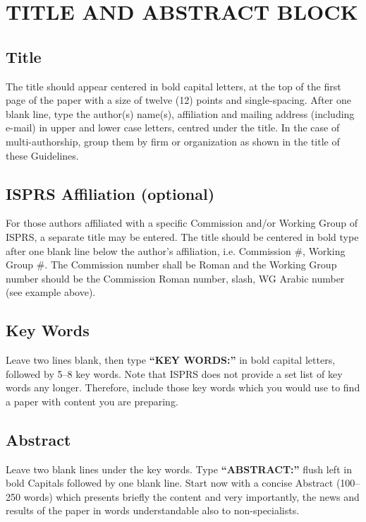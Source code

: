 \documentclass{isprs}
\begin{document}
\section{TITLE AND ABSTRACT BLOCK}\label{sec:TITLE AND ABSTRACT BLOCK}

\subsection{Title}\label{sec:Title}

The title should appear centered in bold capital letters, at the top of the 
first page of the paper with a size of twelve (12) points and single-spacing. 
After one blank line, type the author(s) name(s), affiliation and mailing address 
(including e-mail) in upper and lower case letters, centred under the title. In the 
case of multi-authorship, group them by firm or organization as shown in the title 
of these Guidelines. 

\subsection{ISPRS Affiliation (optional)}\label{sec:ISPRS Affiliation (optional)}

For those authors affiliated with a specific Commission and/or Working Group of 
ISPRS, a separate title may be entered. The title should be centered in bold type 
after one blank line below the author's affiliation, i.e. Commission \#, Working Group \#. 
The Commission number shall be Roman and the Working Group number should be the Commission 
Roman number, slash, WG Arabic number (see example above).


\subsection{Key Words}\label{sec:Key Words}

Leave two lines blank, then type \textbf{``KEY WORDS:''}
in bold capital letters, followed by 5--8 key words. Note that ISPRS does not provide a set 
list of key words any longer. Therefore, include those key words which you would 
use to find a paper with content you are preparing.


\subsection{Abstract}\label{sec:Abstract}

Leave two blank lines under the key words. Type \textbf{``ABSTRACT:''}
flush left in bold Capitals followed by one blank line. Start now
with a concise Abstract (100--250 words) which presents briefly the
content and very importantly, the news and results of the paper in
words understandable also to non-specialists. 
\end{document}
